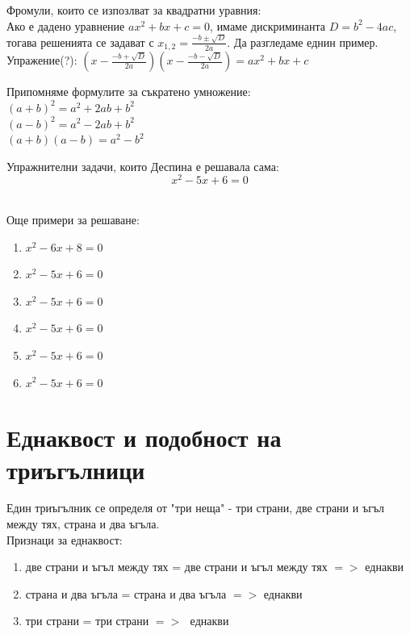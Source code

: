 \documentclass{article}
\begin{document}
	
	
	Фромули, които се изпозлват за квадратни уравния: \\
	Ако е дадено уравнение $ax^2 + bx + c = 0  $, имаме дискриминанта  $ D= b^2 - 4ac $, тогава решенията се задават с $ x_{1,2} = \frac{-b \pm \sqrt{D}  }{2a}$. Да разгледаме еднин пример. 
	Упражение(?): $(x - \frac{-b + \sqrt{D}  }{2a}  )(x - \frac{-b - \sqrt{D}  }{2a}) = ax^2 + bx +c $

	
	Припомняме формулите за съкратено умножение:\\
	 $(a+b)^2 = a^2 + 2ab + b^2$ \\
	 $(a-b)^2 = a^2 - 2ab + b^2$ \\
	 $(a+b)(a-b) = a^2 - b^2 $
	 
	 \vspace{1cm}
	 
	 
	
	Упражнителни задачи, които Деспина е решавала сама: \\
	
		$$x^2 - 5x + 6 = 0$$  \\
		
		
		\vspace{3cm}
		
		Още примери за решаване: \\
		\begin{enumerate}
			\item $x^2 - 6x + 8 = 0$
			\item $x^2 - 5x + 6 = 0$
			\item $x^2 - 5x + 6 = 0$
			\item $x^2 - 5x + 6 = 0$
			\item $x^2 - 5x + 6 = 0$
			\item $x^2 - 5x + 6 = 0$
		\end{enumerate}

		
		
		\newpage
	\section{Еднаквост и подобност на триъгълници}	
	
	Един триъгълник се определя от "три неща" - 
	три страни, две страни и ъгъл между тях, страна и два ъгъла. \\
	
	
	Признаци за еднаквост:
	\begin{enumerate}
		\item две страни и ъгъл между тях = две страни и ъгъл между тях $=>$  еднакви
		\item страна и два ъгъла = страна и два ъгъла $=>$  еднакви
		\item три страни = три страни $=>$ $ $ еднакви
	\end{enumerate}
\end{document}
